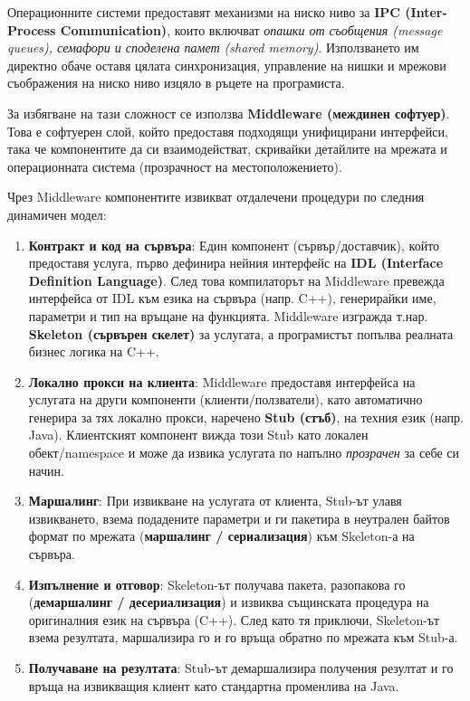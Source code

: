 \documentclass{scrartcl}
\begin{document}
\begin{FlushLeft}
Операционните системи предоставят механизми на ниско ниво за \textbf{IPC (Inter-Process Communication)}, които включват \textit{опашки от съобщения (message queues), семафори и споделена памет (shared memory)}. Използването им директно обаче оставя цялата синхронизация, управление на нишки и мрежови съображения на ниско ниво изцяло в ръцете на програмиста.

За избягване на тази сложност се използва \textbf{Middleware (междинен софтуер)}. Това е софтуерен слой, който предоставя подходящи унифицирани интерфейси, така че компонентите да си взаимодействат, скривайки детайлите на мрежата и операционната система (прозрачност на местоположението).

Чрез Middleware компонентите извикват отдалечени процедури по следния динамичен модел:

\begin{enumerate}
    \item \textbf{Контракт и код на сървъра}: Един компонент (сървър/доставчик), който предоставя услуга, първо дефинира нейния интерфейс на \textbf{IDL (Interface Definition Language)}. След това компилаторът на Middleware превежда интерфейса от IDL към езика на сървъра (напр. C++), генерирайки име, параметри и тип на връщане на функцията. Middleware изгражда т.нар. \textbf{Skeleton (сървърен скелет)} за услугата, а програмистът попълва реалната бизнес логика на C++.
    \item \textbf{Локално прокси на клиента}: Middleware предоставя интерфейса на услугата на други компоненти (клиенти/ползватели), като автоматично генерира за тях локално прокси, наречено \textbf{Stub (стъб)}, на техния език (напр. Java). Клиентският компонент вижда този Stub като локален обект/namespace и може да извика услугата по напълно \textit{прозрачен} за себе си начин.
    \item \textbf{Маршалинг}: При извикване на услугата от клиента, Stub-ът улавя извикването, взема подадените параметри и ги пакетира в неутрален байтов формат по мрежата (\textbf{маршалинг / сериализация}) към Skeleton-а на сървъра.
    \item \textbf{Изпълнение и отговор}: Skeleton-ът получава пакета, разопакова го (\textbf{демаршалинг / десериализация}) и извиква същинската процедура на оригиналния език на сървъра (C++). След като тя приключи, Skeleton-ът взема резултата, маршализира го и го връща обратно по мрежата към Stub-а.
    \item \textbf{Получаване на резултата}: Stub-ът демаршализира получения резултат и го връща на извикващия клиент като стандартна променлива на Java.
\end{enumerate}


\end{FlushLeft}
\end{document}
